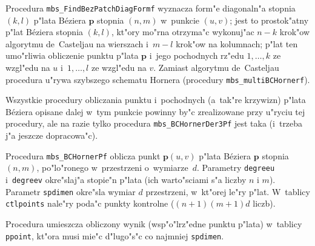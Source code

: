 \vspace{\bigskipamount}
Procedura \texttt{mbs\_FindBezPatchDiagFormf} wyznacza form"e diagonaln"a
stopnia $(k,l)$ p"lata B\'{e}ziera $\bm{p}$ stopnia $(n,m)$ w~punkcie $(u,v)$;
jest to prostok"atny p"lat B\'{e}ziera stopnia $(k,l)$, kt"ory mo"rna otrzyma"c
wykonuj"ac $n-k$ krok"ow algorytmu de~Casteljau na wierszach i~$m-l$ krok"ow
na kolumnach; p"lat ten umo"rliwia obliczenie punktu p"lata $\bm{p}$ i~jego
pochodnych rz"edu $1,\ldots,k$ ze wzgl"edu na $u$ i~$1,\ldots,l$ ze wzgl"edu
na $v$. Zamiast algorytmu de~Casteljau procedura u"rywa szybszego
schematu Hornera (procedury \texttt{mbs\_multiBCHornerf}).

Wszystkie procedury obliczania punktu i~pochodnych (a~tak"re krzywizn)
p"lata B\'{e}ziera opisane dalej w~tym punkcie powinny by"c zrealizowane
przy u"ryciu tej procedury, ale na razie tylko procedura
\texttt{mbs\_BCHornerDer3Pf} jest taka (i~trzeba j"a jeszcze dopracowa"c).


\vspace{\bigskipamount}
\begin{sloppypar}
Procedura \texttt{mbs\_BCHornerPf} oblicza punkt $\bm{p}(u,v)$ p"lata
B\'{e}ziera $\bm{p}$ stopnia $(n,m)$, po"lo"ronego w~przestrzeni
o~wymiarze~$d$. Parametry \texttt{degreeu} i~\texttt{degreev} okre"slaj"a
stopie"n p"lata (ich warto"sciami s"a liczby $n$ i $m$). Parametr
\texttt{spdimen} okre"sla wymiar $d$ przestrzeni, w~kt"orej le"ry p"lat.
W~tablicy \texttt{ctlpoints} nale"ry poda"c punkty kontrolne ($(n+1)(m+1)d$
liczb).%
\end{sloppypar}

Procedura umieszcza obliczony wynik (wsp"o"lrz"edne punktu p"lata) w~tablicy
\texttt{ppoint}, kt"ora musi mie"c d"lugo"s"c co najmniej \texttt{spdimen}.

